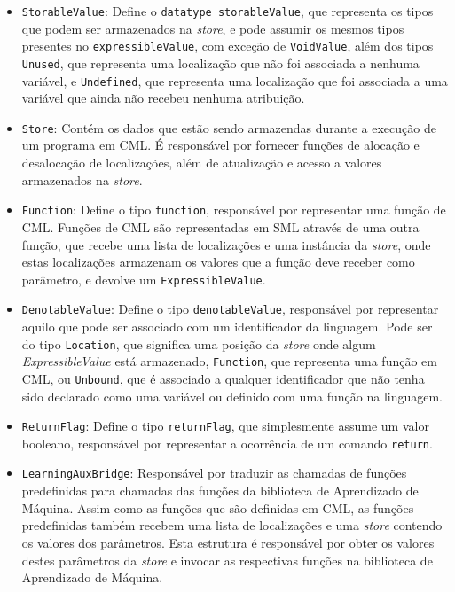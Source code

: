 \documentclass[12pt]{article}
\begin{document}
\begin{enumerate}
\begin{itemize}
\item \texttt{StorableValue}: Define o \texttt{datatype storableValue}, que representa os tipos que podem ser armazenados na \textit{store}, e pode assumir os mesmos tipos presentes no \texttt{expressibleValue}, com exceção de \texttt{VoidValue}, além dos tipos \texttt{Unused}, que representa uma localização que não foi associada a nenhuma variável, e \texttt{Undefined}, que representa uma localização que foi associada a uma variável que ainda não recebeu nenhuma atribuição.

\item \texttt{Store}: Contém os dados que estão sendo armazendas durante a execução de um programa em CML. É responsável por fornecer funções de alocação e desalocação de localizações, além de atualização e acesso a valores armazenados na \textit{store}.

\item \texttt{Function}: Define o tipo \texttt{function}, responsável por representar uma função de CML. Funções de CML são representadas em SML através de uma outra função, que recebe uma lista de localizações e uma instância da \textit{store}, onde estas localizações armazenam os valores que a função deve receber como parâmetro, e devolve um \texttt{ExpressibleValue}.

\item \texttt{DenotableValue}: Define o tipo \texttt{denotableValue}, responsável por representar aquilo que pode ser associado com um identificador da linguagem. Pode ser do tipo \texttt{Location}, que significa uma posição da \textit{store} onde algum  \textit{ExpressibleValue} está armazenado, \texttt{Function}, que representa uma função em CML, ou \texttt{Unbound}, que é associado a qualquer identificador que não tenha sido declarado como uma variável ou definido com uma função na linguagem.

\item \texttt{ReturnFlag}: Define o tipo \texttt{returnFlag}, que simplesmente assume um valor booleano, responsável por representar a ocorrência de um comando \texttt{return}.

\item \texttt{LearningAuxBridge}: Responsável por traduzir as chamadas de funções predefinidas para chamadas das funções da biblioteca de Aprendizado de Máquina. Assim como as funções que são definidas em CML, as funções predefinidas também recebem uma lista de localizações e uma \textit{store} contendo os valores dos parâmetros. Esta estrutura é responsável por obter os valores destes parâmetros da \textit{store} e invocar as respectivas funções na biblioteca de Aprendizado de Máquina.


\end{itemize}
\end{enumerate}
\end{document}
